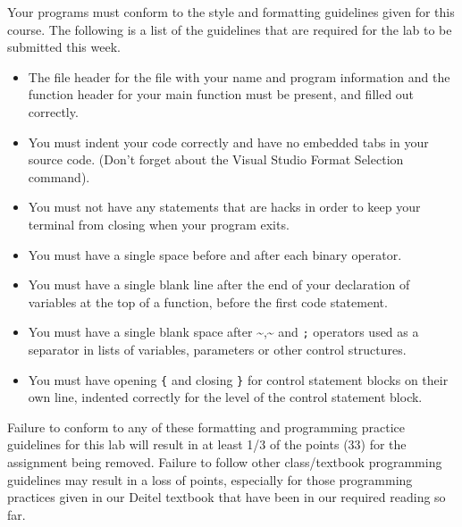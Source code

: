 \documentclass[11pt]{article}
\begin{document}
Your programs must conform to the style and formatting guidelines given for this course.
The following is a list of the guidelines that are required for the lab to be submitted
this week.

\begin{itemize}
\item The file header for the file with your name and program information
and the function header for your main function must be present, and
filled out correctly.
\item You must indent your code correctly and have no embedded tabs in
your source code. (Don't forget about the Visual Studio Format
Selection command).
\item You must not have any statements that are hacks in order to keep
your terminal from closing when your program exits.
\item You must have a single space before and after each binary operator.
\item You must have a single blank line after the end of your declaration
of variables at the top of a function, before the first code
statement.
\item You must have a single blank space after \textasciitilde{},\textasciitilde{} and \verb~;~ operators used as a
separator in lists of variables, parameters or other control
structures.
\item You must have opening \verb~{~ and closing \verb~}~ for control statement blocks
on their own line, indented correctly for the level of the control
statement block.
\end{itemize}

Failure to conform to any of these formatting and programming practice
guidelines for this lab will result in at least 1/3 of the points (33)
for the assignment being removed.  Failure to follow other
class/textbook programming guidelines may result in a loss of points,
especially for those programming practices given in our Deitel
textbook that have been in our required reading so far.
\end{document}
